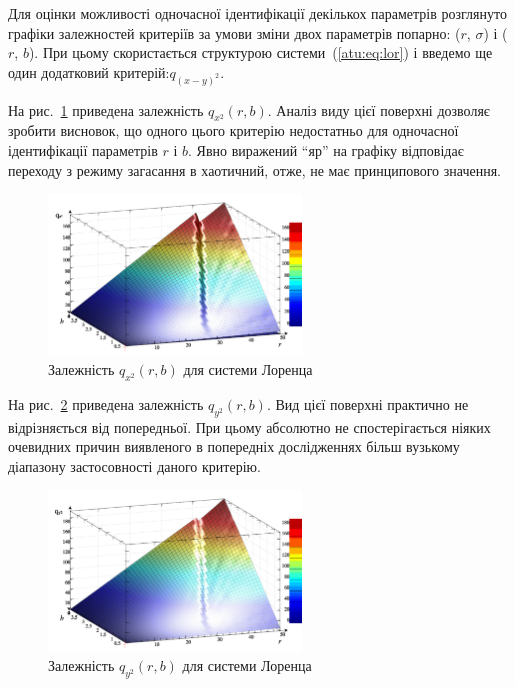 Для оцінки можливості одночасної ідентифікації декількох параметрів
розглянуто графіки залежностей критеріїв за умови зміни двох параметрів
попарно: ($r$, $\sigma$) і ($r$, $b$).
%
При цьому скористається структурою системи~(\ref{atu:eq:lor}) і введемо
ще один додатковий критерій:$ q_{(x-y)^2} $.

На рис.~\ref{atu:f:lor_qx2_r_b} приведена залежність
$ q_{x^2} (r, b) $. Аналіз виду цієї поверхні дозволяє зробити
висновок, що одного цього критерію недостатньо для одночасної
ідентифікації параметрів
$ r $ і
$ b $. Явно виражений ``яр'' на графіку відповідає переходу з режиму
загасання в хаотичний, отже, не має принципового значення.

\begin{figure}[ht!]
  \begin{center}
    \includegraphics[width=0.60\textwidth]{p/cha/lor/q2d/lor_qx2_r_b.png}
  \end{center}
  \caption{Залежність $ q_{x^2} (r, b) $ для системи Лоренца}
  \label{atu:f:lor_qx2_r_b}
\end{figure}


На рис.~\ref{atu:f:lor_qy2_r_b} приведена залежність
$ q_{y^2} (r, b) $. Вид цієї поверхні практично не відрізняється від
попередньої. При цьому абсолютно не спостерігається ніяких
очевидних причин виявленого в попередніх дослідженнях більш
вузькому діапазону застосовності даного критерію.

\begin{figure}[ht!]
  \begin{center}
    \includegraphics[width=0.60\textwidth]{p/cha/lor/q2d/lor_qy2_r_b.png}
  \end{center}
  \caption{Залежність $ q_{y^2} (r, b) $ для системи Лоренца}
  \label{atu:f:lor_qy2_r_b}
\end{figure}

